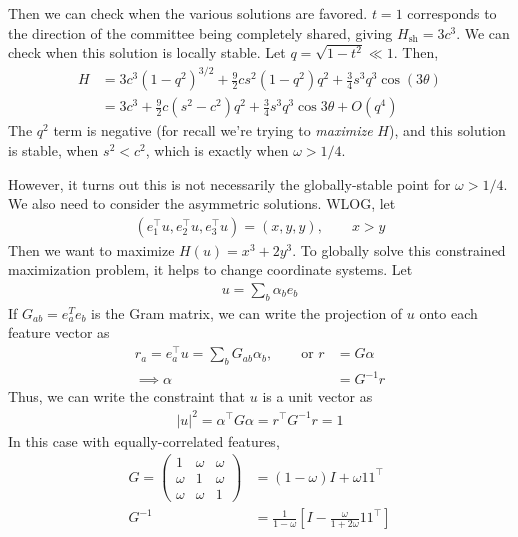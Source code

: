 \documentclass[11pt, reqno]{amsart}
\theoremstyle{notestyle}
\theoremstyle{defstyle}
\begin{document}
Then we can check when the various solutions are favored.
$t = 1$ corresponds to the direction of the committee being completely shared, giving $H_\text{sh} = 3c^3$.
We can check when this solution is locally stable.
Let $q = \sqrt{1-t^2} \ll 1$.
Then,
\begin{align*}
    H
    &= 3c^3 (1-q^2)^{3/2}
    + \frac{9}{2} cs^2 (1-q^2)q^2
    + \frac{3}{4} s^3 q^3 \cos (3\theta) \\
    &= 3c^3 + \frac{9}{2} c(s^2 - c^2)q^2
    + \frac{3}{4} s^3 q^3 \cos 3\theta + O(q^4)
\end{align*}
The $q^2$ term is negative (for recall we're trying to \emph{maximize} $H$), and this solution is stable, when $s^2 < c^2$, which is exactly when $\omega > 1/4$.

However, it turns out this is not necessarily the globally-stable point for $\omega > 1/4$.
We also need to consider the asymmetric solutions.
WLOG, let
\begin{align*}
(e_1^\top u, e_2^\top u, e_3^\top u)
= (x, y, y), \qquad x > y
\end{align*}
Then we want to maximize $H(u) = x^3 + 2y^3$.
To globally solve this constrained maximization problem, it helps to change coordinate systems.
Let
\begin{align}
    u = \sum_b \alpha_b e_b
\end{align}
If $G_{ab} = e_a^T e_b$ is the Gram matrix, we can write the projection of $u$ onto each feature vector as
\begin{align*}
    r_a  = e_a^\top u
    = \sum_b G_{ab} \alpha_b,
    \qquad \text{or }
    r &= G \alpha \\
    \implies
    \alpha &= G^{-1} r
\end{align*}
Thus, we can write the constraint that $u$ is a unit vector as
\begin{align*}
    |u|^2 = \alpha^\top G \alpha = r^\top G^{-1}  r = 1
\end{align*}
In this case with equally-correlated features,
\begin{align*}
    G
    = \begin{pmatrix}
        1 & \omega & \omega \\
        \omega & 1 & \omega \\
        \omega & \omega & 1
    \end{pmatrix}
    &= (1-\omega)I + \omega 1 1^\top \\
    G^{-1}
    &= \frac{1}{1-\omega} \left[I - \frac{\omega}{1 + 2\omega} 1 1^\top \right]
\end{align*}
\end{document}
